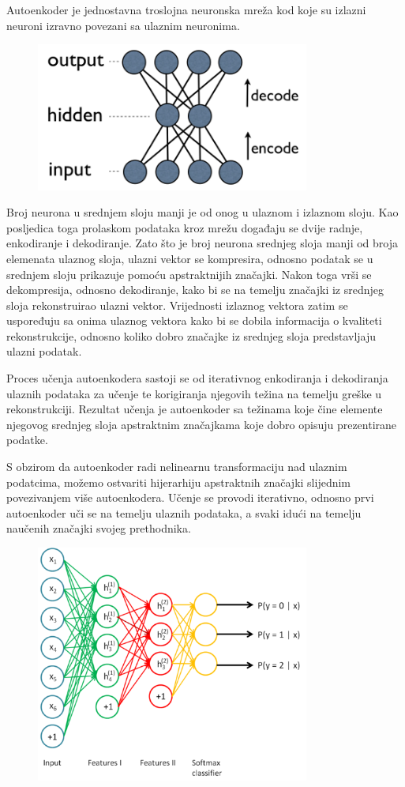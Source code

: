 \documentclass[lmodern, utf8, diplomski, numeric]{fer}
\begin{document}
Autoenkoder je jednostavna troslojna neuronska mreža kod koje su izlazni neuroni izravno povezani sa ulaznim neuronima. 

\begin{figure}[ht!]
\centering
\includegraphics[width=9cm]{slike/autoenkoder.png}
\caption{}
\end{figure}

Broj neurona u srednjem sloju manji je od onog u ulaznom i izlaznom sloju. Kao posljedica toga prolaskom podataka kroz mrežu događaju se dvije radnje, enkodiranje i dekodiranje. Zato što je broj neurona srednjeg sloja manji od broja elemenata ulaznog sloja, ulazni vektor se kompresira, odnosno podatak se u srednjem sloju prikazuje pomoću apstraktnijih značajki. Nakon toga vrši se dekompresija, odnosno dekodiranje, kako bi se na temelju značajki iz srednjeg sloja rekonstruirao ulazni vektor.
Vrijednosti izlaznog vektora zatim se uspoređuju sa onima ulaznog vektora kako bi se dobila informacija o kvaliteti rekonstrukcije, odnosno koliko dobro značajke iz srednjeg sloja predstavljaju ulazni podatak.

Proces učenja autoenkodera sastoji se od iterativnog enkodiranja i dekodiranja ulaznih podataka za učenje te korigiranja njegovih težina na temelju greške u rekonstrukciji. Rezultat učenja je autoenkoder sa težinama koje čine elemente njegovog srednjeg sloja apstraktnim značajkama koje dobro opisuju prezentirane podatke. 

S obzirom da autoenkoder radi nelinearnu transformaciju nad ulaznim podatcima, možemo ostvariti hijerarhiju apstraktnih značajki slijednim povezivanjem više autoenkodera. Učenje se provodi iterativno, odnosno prvi autoenkoder uči se na temelju ulaznih podataka, a svaki idući na temelju naučenih značajki svojeg prethodnika. 

\begin{figure}[ht!]	
\centering
\includegraphics[width=9cm]{slike/stacked_autoencoders.png}
\caption{}
\end{figure}
\end{document}
